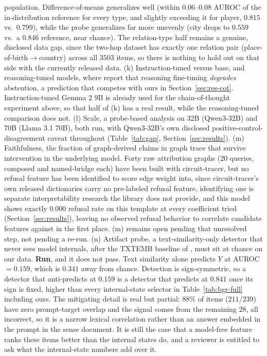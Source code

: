 \documentclass{article}
\newif\ifredflags
\newcommand{\rf}[1]{\ifredflags{\textcolor{red}{\textbf{[MISSING: #1]}}}\fi}
\begin{document}
population. Difference-of-means generalizes well (within $0.06$--$0.08$ AUROC of the in-distribution
reference for every type, and slightly exceeding it for player, $0.815$ vs.\ $0.799$), while the probe
generalizes far more unevenly (city drops to $0.559$ vs.\ a $0.846$ reference, near chance). The
relation-type half remains a genuine, disclosed data gap, since the two-hop dataset has exactly one
relation pair (place-of-birth$\to$country) across all $3503$ items, so there is nothing to hold out on
that side with the currently released data.
(k) Instruction-tuned versus base, and reasoning-tuned models, where
\citet{kirichenko2025abstentionbench} report that reasoning fine-tuning \emph{degrades} abstention, a
prediction that competes with ours in Section~\ref{sec:res-cot}. Instruction-tuned Gemma 2 9B is
already used for the chain-of-thought experiment above, so that half of (k) has a real result, while
the reasoning-tuned comparison does not. (l) Scale, a probe-based analysis on 32B (Qwen3-32B) and 70B (Llama 3.1 70B), both run, with
Qwen3-32B's own disclosed positive-control-disagreement caveat throughout (Table~\ref{tab:gap}, Section~\ref{sec:results}).
(m) Faithfulness, the fraction of graph-derived claims in graph trace that survive intervention
in the underlying model. Forty raw attribution graphs (20 queries, composed and named-bridge each)
have been built with circuit-tracer, but no refusal feature has been identified to score
edge weight into, since circuit-tracer's own released dictionaries carry no pre-labeled refusal feature,
identifying one is separate interpretability research the library does not provide, and this model
shows exactly $0.000$ refusal rate on this template at every coefficient tried (Section~\ref{sec:results}), leaving no
observed refusal behavior to correlate candidate features against in the first place. (m) remains
open pending that unresolved step, not pending a re-run. (n) Artifact probe, a
text-similarity-only detector that never sees model internals, after the TXTEMB baseline of
\citet{hussain2026parallax}, must sit at chance on our data. \textbf{Run}, and it does not pass. Text similarity alone predicts $Y$ at AUROC$=0.159$, which is
$0.341$ away from chance. Detection is sign-symmetric, so a detector that anti-predicts at $0.159$ is
a detector that predicts at $0.841$ once its sign is fixed, higher than every internal-state selector
in Table~\ref{tab:bgr-full} including ours. The mitigating detail is real but partial: $88\%$ of items
($211/239$) have zero prompt-target overlap and the signal comes from the remaining $28$, all
incorrect, so it is a narrow lexical correlation rather than an answer embedded in the prompt in the
sense \citet{hussain2026parallax} document. It is still the case that a model-free feature ranks these
items better than the internal states do, and a reviewer is entitled to ask what the internal-state
numbers add over it. \rf{re-run every selector in Table~\ref{tab:bgr-full} on the $211$-item
zero-overlap subset, and report whether BGR's margin over the surface gate survives there. Until that
exists, control (n) is a failed artifact check, and we label it so.}
\end{document}
